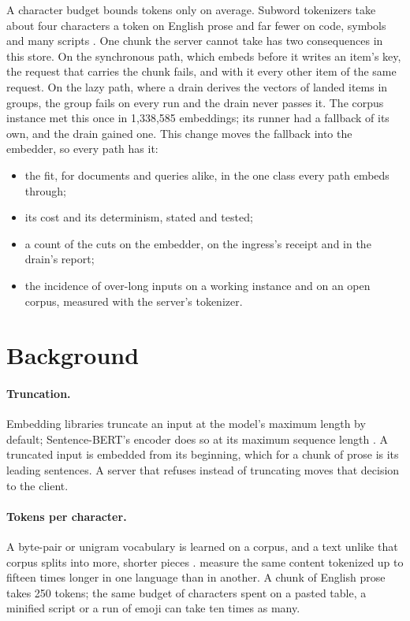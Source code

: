 \documentclass[11pt]{article}
\theoremstyle{plain}
\theoremstyle{remark}
\begin{document}
A character budget bounds tokens only on average. Subword tokenizers
\citep{sennrich2016bpe,kudo2018sentencepiece} take about four characters a token on English prose
and far fewer on code, symbols and many scripts \citep{petrov2023unfairness}. One chunk the server
cannot take has two consequences in this store. On the synchronous path, which embeds before it
writes an item's key, the request that carries the chunk fails, and with it every other item of
the same request. On the lazy path, where a drain derives the vectors of landed items in groups,
the group fails on every run and the drain never passes it. The corpus instance met this once in
1{,}338{,}585 embeddings; its runner had a fallback of its own, and the drain gained one. This
change moves the fallback into the embedder, so every path has it:

\begin{itemize}
\item the fit, for documents and queries alike, in the one class every path embeds through;
\item its cost and its determinism, stated and tested;
\item a count of the cuts on the embedder, on the ingress's receipt and in the drain's report;
\item the incidence of over-long inputs on a working instance and on an open corpus, measured with
  the server's tokenizer.
\end{itemize}

\section{Background}

\paragraph{Truncation.} Embedding libraries truncate an input at the model's maximum length by
default; Sentence-BERT's encoder does so at its maximum sequence length
\citep{reimers2019sbert}. A truncated input is embedded from its beginning, which for a chunk of
prose is its leading sentences. A server that refuses instead of truncating moves that decision
to the client.

\paragraph{Tokens per character.} A byte-pair or unigram vocabulary is learned on a corpus, and a
text unlike that corpus splits into more, shorter pieces \citep{sennrich2016bpe,kudo2018sentencepiece}.
 measure the same content tokenized up to fifteen times longer in one
language than in another. A chunk of English prose takes 250 tokens; the same budget of characters
spent on a pasted table, a minified script or a run of emoji can take ten times as many.
\end{document}
